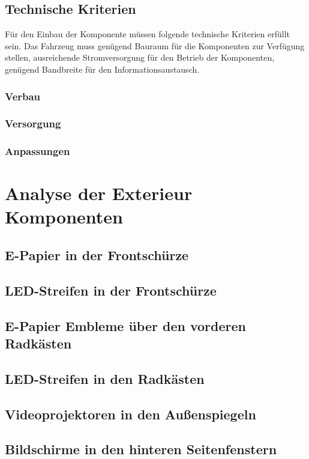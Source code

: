 \subsection{Technische Kriterien}
Für den Einbau der Komponente müssen folgende technische Kriterien erfüllt sein. Das Fahrzeug muss genügend Bauraum für die Komponenten zur Verfügung stellen, ausreichende Stromversorgung für den Betrieb der Komponenten, genügend Bandbreite für den Informationsaustausch.
\subsubsection{Verbau}
\subsubsection{Versorgung}
\subsubsection{Anpassungen}

\section{Analyse der Exterieur Komponenten}
\subsection{E-Papier in der Frontschürze}

\subsection{LED-Streifen in der Frontschürze}

\subsection{E-Papier Embleme über den vorderen Radkästen}

\subsection{LED-Streifen in den Radkästen}
 
\subsection{Videoprojektoren in den Außenspiegeln}
\subsection{Bildschirme in den hinteren Seitenfenstern}
